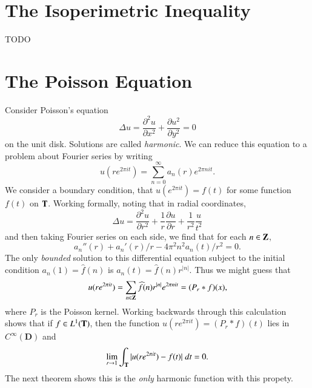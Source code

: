 \section{The Isoperimetric Inequality}

TODO

\section{The Poisson Equation}

Consider Poisson's equation
%
\[ \Delta u = \frac{\partial^2 u}{\partial x^2} + \frac{\partial u^2}{\partial y^2} = 0 \]
%
on the unit disk. Solutions are called \emph{harmonic}. We can reduce this equation to a problem about Fourier series by writing
%
\[ u(re^{2 \pi it}) = \sum_{n = 0}^\infty a_n(r) e^{2 \pi n i t}. \]
%
We consider a boundary condition, that $u(e^{2 \pi i t}) = f(t)$ for some function $f(t)$ on $\operatorname{\mathbf{T}}$. Working formally, noting that in radial coordinates,
%
\[ \Delta u = \frac{\partial^2 u}{\partial r^2} + \frac{1}{r} \frac{\partial u}{\partial r} + \frac{1}{r^2} \frac{u}{t^2} \]
%
and then taking Fourier series on each side, we find that for each $n \in \operatorname{\mathbf{Z}}$,
%
\[ a_n''(r) + a_n'(r)/r - 4\pi^2 n^2 a_n(t)/r^2 = 0. \]
%
The only \emph{bounded} solution to this differential equation subject to the initial condition $a_n(1) = \widehat{f}(n)$ is $a_n(t) = \widehat{f}(n) r^{|n|}$. Thus we might guess that
%
\[ u(re^{2 \pi i t}) = \sum_{n \in \operatorname{\mathbf{Z}}} \widehat{f}(n) r^{|n|} e^{2 \pi n i t} = (P_r * f)(x), \]
%
where $P_r$ is the Poisson kernel. Working backwards through this calculation shows that if $f \in L^1(\operatorname{\mathbf{T}})$, then the function $u(re^{2 \pi it}) = (P_r * f)(t)$ lies in $C^\infty(\mathbf{D})$ and
%
\[ \lim_{r \to 1} \int_{\operatorname{\mathbf{T}}} |u(re^{2 \pi i t}) - f(t)|\; dt = 0. \]
%
The next theorem shows this is the \emph{only} harmonic function with this propety.

